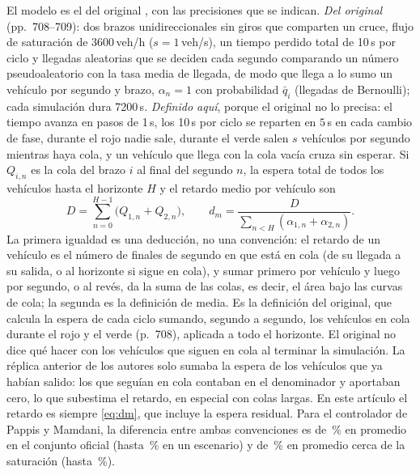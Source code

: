 \documentclass[journal]{IEEEtran}
\newcommand{\qbar}{\bar{q}}              %
\begin{document}
El modelo es el del original \cite{Pappis1977}, con las precisiones que se indican. \emph{Del original} (pp.~708--709): dos brazos unidireccionales sin giros que comparten un cruce, flujo de saturación de 3600\,veh/h ($s=1$\,veh/s), un tiempo perdido total de 10\,s por ciclo y llegadas aleatorias que se deciden cada segundo comparando un número pseudoaleatorio con la tasa media de llegada, de modo que llega a lo sumo un vehículo por segundo y brazo, $\alpha_n=1$ con probabilidad $\qbar_i$ (llegadas de Bernoulli); cada simulación dura 7200\,s. \emph{Definido aquí}, porque el original no lo precisa: el tiempo avanza en pasos de 1\,s, los 10\,s por ciclo se reparten en $5$\,s en cada cambio de fase, durante el rojo nadie sale, durante el verde salen $s$ vehículos por segundo mientras haya cola, y un vehículo que llega con la cola vacía cruza sin esperar. Si $Q_{i,n}$ es la cola del brazo $i$ al final del segundo $n$, la espera total de todos los vehículos hasta el horizonte $H$ y el retardo medio por vehículo son
\begin{equation}
D=\sum_{n=0}^{H-1}\bigl(Q_{1,n}+Q_{2,n}\bigr),\qquad d_m=\frac{D}{\sum_{n<H}(\alpha_{1,n}+\alpha_{2,n})}.
\label{eq:dm}
\end{equation}
La primera igualdad es una deducción, no una convención: el retardo de un vehículo es el número de finales de segundo en que está en cola (de su llegada a su salida, o al horizonte si sigue en cola), y sumar primero por vehículo y luego por segundo, o al revés, da la suma de las colas, es decir, el área bajo las curvas de cola; la segunda es la definición de media. Es la definición del original, que calcula la espera de cada ciclo sumando, segundo a segundo, los vehículos en cola durante el rojo y el verde (p.~708), aplicada a todo el horizonte. El original no dice qué hacer con los vehículos que siguen en cola al terminar la simulación. La réplica anterior de los autores solo sumaba la espera de los vehículos que ya habían salido: los que seguían en cola contaban en el denominador y aportaban cero, lo que subestima el retardo, en especial con colas largas. En este artículo el retardo es siempre \eqref{eq:dm}, que incluye la espera residual. Para el controlador de Pappis y Mamdani, la diferencia entre ambas convenciones es de \ResDifOf\,\% en promedio en el conjunto oficial (hasta \ResDifOfMax\,\% en un escenario) y de \ResDifSa\,\% en promedio cerca de la saturación (hasta \ResDifSaMax\,\%).
\end{document}
